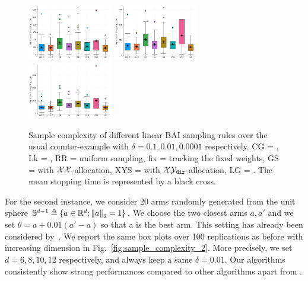 \begin{figure}[ht]
 \centering
 \includegraphics[clip, width= 0.33\textwidth]{Chapter4/img/bai_sin_0-1}
 \includegraphics[clip, width= 0.33\textwidth]{Chapter4/img/bai_sin_0-01}
 \includegraphics[clip, width= 0.33\textwidth]{Chapter4/img/bai_sin_0-0001}
 \caption{Sample complexity of different linear BAI sampling rules over the usual counter-example with $\delta=0.1, 0.01, 0.0001$ respectively. CG = \LGC,  Lk = \LG, RR = uniform sampling, fix = tracking the fixed weights, GS = \XYS with $\mathcal{X}\mathcal{X}$-allocation, XYS = \XYS with $\mathcal{X}\mathcal{Y}_{\texttt{dir}}$-allocation, LG = \LGapE. The mean stopping time is represented by a black cross.}
 \label{fig:sample_complexity_1}
\end{figure}

For the second instance, we consider 20 arms randomly generated from the unit sphere $\mathbb{S}^{d-1}\triangleq\{a\in\mathbb{R}^d; \left\lVert a\right\rVert_2=1\}$. We choose the two closest arms $a, a'$ and we set $\theta = a + 0.01(a'-a)$ so that a is the best arm. This setting has already been considered by~\citet{tao2018alba}. We report the same box plots over 100 replications as before with increasing dimension in Fig.~\ref{fig:sample_complexity_2}. More precisely, we set $d=6, 8, 10, 12$ respectively, and always keep a same $\delta = 0.01$. Our algorithms consistently show strong performances compared to other algorithms apart from \LGapE.


